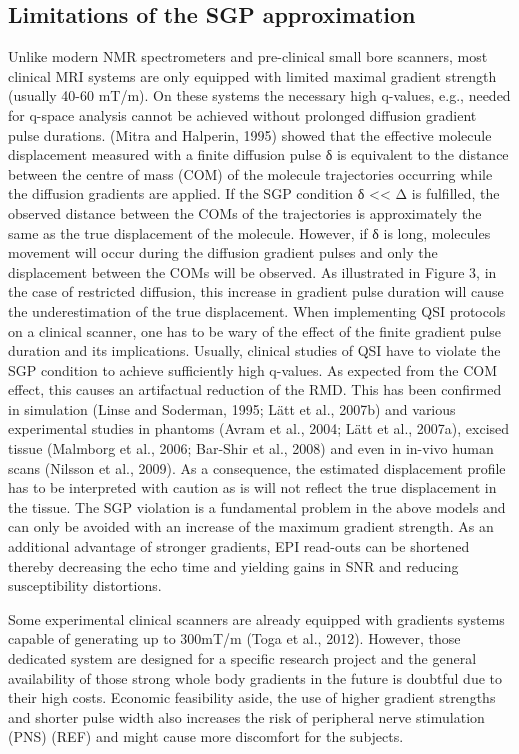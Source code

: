 \subsection{Limitations of the SGP approximation}
Unlike modern NMR spectrometers and pre-clinical small bore scanners, most clinical MRI systems are only equipped with limited maximal gradient strength (usually 40-60 mT/m). On these systems the necessary high q-values, e.g., needed for q-space analysis cannot be achieved without prolonged diffusion gradient pulse durations. (Mitra and Halperin, 1995) showed that the effective molecule displacement measured with a finite diffusion pulse δ is equivalent to the distance between the centre of mass (COM) of the molecule trajectories occurring while the diffusion gradients are applied. If the SGP condition δ << Δ is fulfilled, the observed distance between the COMs of the trajectories is approximately the same as the true displacement of the molecule. However, if δ is long, molecules movement will occur during the diffusion gradient pulses and only the displacement between the COMs will be observed. As illustrated in Figure 3, in the case of restricted diffusion, this increase in gradient pulse duration will cause the underestimation of the true displacement. 
When implementing QSI protocols on a clinical scanner, one has to be wary of the effect of the finite gradient pulse duration and its implications. Usually, clinical studies of QSI have to violate the SGP condition to achieve sufficiently high q-values. As expected from the COM effect, this causes an artifactual reduction of the RMD. This has been confirmed in simulation (Linse and Soderman, 1995; Lätt et al., 2007b) and various experimental studies in phantoms (Avram et al., 2004; Lätt et al., 2007a), excised tissue (Malmborg et al., 2006; Bar-Shir et al., 2008)   and even in in-vivo human scans (Nilsson et al., 2009). As a consequence, the estimated displacement profile has to be interpreted with caution as is will not reflect the true displacement in the tissue. The SGP violation is a fundamental problem in the above models and can only be avoided with an increase of the maximum gradient strength. As an additional advantage of stronger gradients, EPI read-outs can be shortened thereby decreasing the echo time and yielding gains in SNR and reducing susceptibility distortions.

Some experimental clinical scanners are already equipped with gradients systems capable of generating up to 300mT/m (Toga et al., 2012). However, those dedicated system are designed for a specific research project and the general availability of those strong whole body gradients in the future is doubtful due to their high costs. Economic feasibility aside, the use of higher gradient strengths and shorter pulse width also increases the risk of peripheral nerve stimulation (PNS) (REF) and might cause more discomfort for the subjects. 

